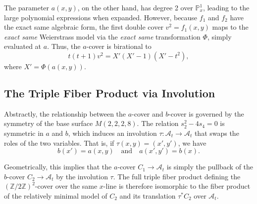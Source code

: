 \documentclass[11pt]{amsart}
\begin{document}
The parameter $a(x,y)$, on the other hand, has degree 2 over $\mathbb{P}^1_x$, leading to the large polynomial expressions when expanded. However, because $f_1$ and $f_2$ have the exact same algebraic form, the first double cover $v^2 = f_1(x,y)$ maps to the \emph{exact same} Weierstrass model via the \emph{exact same} transformation $\Phi$, simply evaluated at $a$. Thus, the $a$-cover is birational to 
\begin{equation} \label{eq:a_cover}
    t(t+1)v^2 = X'(X'-1)(X'-t^2),
\end{equation}
where $X' = \Phi(a(x,y))$. 

\subsection*{The Triple Fiber Product via Involution}
Abstractly, the relationship between the $a$-cover and $b$-cover is governed by the symmetry of the base surface $M(2,2,2,8)$. The relation $s_2^2 - 4s_4 = 0$ is symmetric in $a$ and $b$, which induces an involution $\tau \colon \mathcal{A}_t \to \mathcal{A}_t$ that swaps the roles of the two variables. That is, if $\tau(x,y) = (x', y')$, we have
\[ b(x') = a(x,y) \quad \text{and} \quad a(x',y') = b(x). \]

Geometrically, this implies that the $a$-cover $C_1 \to \mathcal{A}_t$ is simply the pullback of the $b$-cover $C_2 \to \mathcal{A}_t$ by the involution $\tau$. The full triple fiber product defining the $(\mathbb{Z}/2\mathbb{Z})^2$-cover over the same $x$-line is therefore isomorphic to the fiber product of the relatively minimal model of $C_2$ and its translation $\tau^* C_2$ over $\mathcal{A}_t$.
\end{document}

